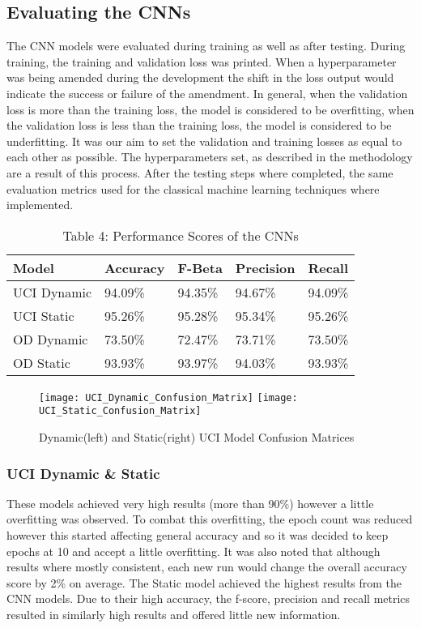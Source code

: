 \subsection{Evaluating the CNNs}
The CNN models were evaluated during training as well as after testing.
During training, the training and validation loss was printed.
When a hyperparameter was being amended during the development the shift in the loss output would indicate the success or failure of the amendment.
In general, when the validation loss is more than the training loss, the model is considered to be overfitting, when the validation loss is less than the training loss, the model is considered to be underfitting.
It was our aim to set the validation and training losses as equal to each other as possible.
The hyperparameters set, as described in the methodology are a result of this process.
After the testing steps where completed, the same evaluation metrics used for the classical machine learning techniques where implemented.

\begin{table}[ht]
    \centering\scriptsize
    \begin{tabular}{|l|l|l|l|l|}
        \hline
        \textbf{Model} & \textbf{Accuracy} & \textbf{F-Beta}  & \textbf{Precision} & \textbf{Recall} \\ \hline
        UCI Dynamic             & 94.09\%           & 94.35\%  & 94.67\% & 94.09\% \\ \hline
        UCI Static            & 95.26\%           & 95.28\% & 95.34\% & 95.26\% \\ \hline
        OD Dynamic               & 73.50\%           & 72.47\% & 73.71\% & 73.50\% \\ \hline
        OD Static            & 93.93\%           & 93.97\% & 94.03\% & 93.93\% \\ \hline
    \end{tabular}
    \caption*{Table 4: Performance Scores of the CNNs}
\end{table}

\begin{figure}[h]
\centering
\texttt{[image: UCI\_Dynamic\_Confusion\_Matrix]}\hfill
\texttt{[image: UCI\_Static\_Confusion\_Matrix]}\hfill
\caption{Dynamic(left) and Static(right) UCI Model Confusion Matrices}
\label{fig:UCI_Confusions}
\end{figure}

\subsubsection{UCI Dynamic \& Static}
These models achieved very high results (more than 90\%) however a little overfitting was observed.
To combat this overfitting, the epoch count was reduced however this started affecting general accuracy and so it was decided to keep epochs at 10 and accept a little overfitting.
It was also noted that although results where mostly consistent, each new run would change the overall accuracy score by 2\% on average.
The Static model achieved the highest results from the CNN models.
Due to their high accuracy, the f-score, precision and recall metrics resulted in similarly high results and offered little new information.

